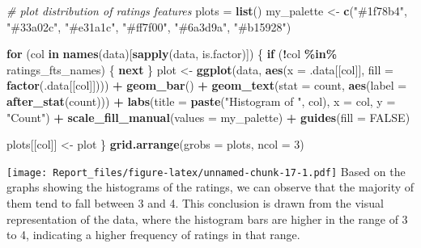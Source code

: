 \documentclass[
]{article}
\newenvironment{Shaded}{\begin{snugshade}}{\end{snugshade}}
\newcommand{\AttributeTok}[1]{\textcolor[rgb]{0.13,0.29,0.53}{#1}}
\newcommand{\CommentTok}[1]{\textcolor[rgb]{0.56,0.35,0.01}{\textit{#1}}}
\newcommand{\ConstantTok}[1]{\textcolor[rgb]{0.56,0.35,0.01}{#1}}
\newcommand{\ControlFlowTok}[1]{\textcolor[rgb]{0.13,0.29,0.53}{\textbf{#1}}}
\newcommand{\DecValTok}[1]{\textcolor[rgb]{0.00,0.00,0.81}{#1}}
\newcommand{\FunctionTok}[1]{\textcolor[rgb]{0.13,0.29,0.53}{\textbf{#1}}}
\newcommand{\NormalTok}[1]{#1}
\newcommand{\OtherTok}[1]{\textcolor[rgb]{0.56,0.35,0.01}{#1}}
\newcommand{\SpecialCharTok}[1]{\textcolor[rgb]{0.81,0.36,0.00}{\textbf{#1}}}
\newcommand{\StringTok}[1]{\textcolor[rgb]{0.31,0.60,0.02}{#1}}
\begin{document}
\begin{Shaded}
\begin{Highlighting}[]
\CommentTok{\# plot distribution of ratings features}
\NormalTok{plots }\OtherTok{=} \FunctionTok{list}\NormalTok{()}
\NormalTok{my\_palette }\OtherTok{\textless{}{-}} \FunctionTok{c}\NormalTok{(}\StringTok{"\#1f78b4"}\NormalTok{, }\StringTok{"\#33a02c"}\NormalTok{, }\StringTok{"\#e31a1c"}\NormalTok{, }\StringTok{"\#ff7f00"}\NormalTok{, }\StringTok{"\#6a3d9a"}\NormalTok{, }\StringTok{"\#b15928"}\NormalTok{)}

\ControlFlowTok{for}\NormalTok{ (col }\ControlFlowTok{in} \FunctionTok{names}\NormalTok{(data)[}\FunctionTok{sapply}\NormalTok{(data, is.factor)]) \{}
  \ControlFlowTok{if}\NormalTok{ (}\SpecialCharTok{!}\NormalTok{col }\SpecialCharTok{\%in\%}\NormalTok{ ratings\_fts\_names) \{}
    \ControlFlowTok{next}
\NormalTok{  \}}
\NormalTok{  plot }\OtherTok{\textless{}{-}} \FunctionTok{ggplot}\NormalTok{(data, }\FunctionTok{aes}\NormalTok{(}\AttributeTok{x =}\NormalTok{ .data[[col]], }\AttributeTok{fill =} \FunctionTok{factor}\NormalTok{(.data[[col]]))) }\SpecialCharTok{+}
    \FunctionTok{geom\_bar}\NormalTok{() }\SpecialCharTok{+}
    \FunctionTok{geom\_text}\NormalTok{(}\AttributeTok{stat =} \StringTok{\textquotesingle{}count\textquotesingle{}}\NormalTok{, }\FunctionTok{aes}\NormalTok{(}\AttributeTok{label =} \FunctionTok{after\_stat}\NormalTok{(count))) }\SpecialCharTok{+}  
    \FunctionTok{labs}\NormalTok{(}\AttributeTok{title =} \FunctionTok{paste}\NormalTok{(}\StringTok{"Histogram of "}\NormalTok{, col), }\AttributeTok{x =}\NormalTok{ col, }\AttributeTok{y =} \StringTok{"Count"}\NormalTok{) }\SpecialCharTok{+}
    \FunctionTok{scale\_fill\_manual}\NormalTok{(}\AttributeTok{values =}\NormalTok{ my\_palette) }\SpecialCharTok{+}
    \FunctionTok{guides}\NormalTok{(}\AttributeTok{fill =} \ConstantTok{FALSE}\NormalTok{)}

\NormalTok{  plots[[col]] }\OtherTok{\textless{}{-}}\NormalTok{ plot}
\NormalTok{\}}
\FunctionTok{grid.arrange}\NormalTok{(}\AttributeTok{grobs =}\NormalTok{ plots, }\AttributeTok{ncol =} \DecValTok{3}\NormalTok{)}
\end{Highlighting}
\end{Shaded}

\texttt{[image: Report\_files/figure-latex/unnamed-chunk-17-1.pdf]} Based
on the graphs showing the histograms of the ratings, we can observe that
the majority of them tend to fall between 3 and 4. This conclusion is
drawn from the visual representation of the data, where the histogram
bars are higher in the range of 3 to 4, indicating a higher frequency of
ratings in that range.
\end{document}
